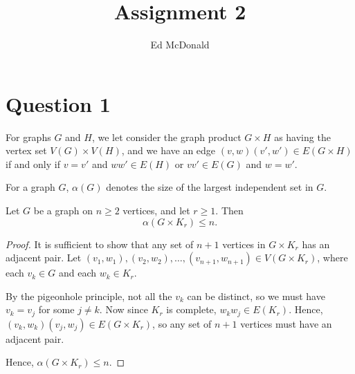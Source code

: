 \documentclass{unswmaths}
\begin{document}
\subject{Graph Theory}
\author{Ed McDonald}
\title{Assignment 2}


\setlength\parindent{0pt}


\unswtitle{}


\section*{Question 1}
For graphs $G$ and $H$, we let consider the graph
product $G\times H$ as having the vertex set $V(G)\times V(H)$,
and we have an edge $(v,w)(v',w') \in E(G\times H)$
if and only if $v = v'$ and $ww' \in E(H)$ or $vv' \in E(G)$ and $w = w'$. 

For a graph $G$, $\alpha(G)$ denotes the size of the largest independent
set in $G$.

\begin{lemma}[Part (a)]
    Let $G$ be a graph on $n \geq 2$ vertices, and let $r \geq 1$. Then
    \begin{equation*}
        \alpha(G \times K_r) \leq n.
    \end{equation*}     
\end{lemma}
\begin{proof}
    It is sufficient to show that any set of $n+1$ vertices
    in $G\times K_r$ has an adjacent pair. 
    Let $(v_1,w_1),(v_2,w_2),\ldots,(v_{n+1},w_{n+1}) \in V(G\times K_r)$,
    where each $v_k \in G$ and each $w_k \in K_r$. 
    
    By the pigeonhole principle, not all the $v_k$ can be distinct,
    so we must have $v_k = v_j$ for some $j \neq k$. Now since
    $K_r$ is complete, $w_kw_j \in E(K_r)$. Hence, $(v_k,w_k)(v_j,w_j) \in E(G\times K_r)$,
    so any set of $n+1$ vertices must have an adjacent pair.
    
    Hence, $\alpha(G\times K_r) \leq n$.    
\end{proof}
\end{document}
